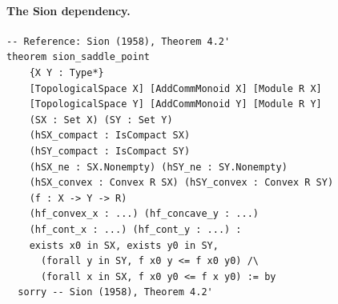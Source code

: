 \documentclass[11pt,a4paper]{article}
\theoremstyle{definition}
\begin{document}
\paragraph{The Sion dependency.}
\begin{lstlisting}[caption={Sion's minimax theorem in the dependency file (excerpt from \texttt{Dependencies.lean}).},label={lst:sion}]
-- Reference: Sion (1958), Theorem 4.2'
theorem sion_saddle_point
    {X Y : Type*}
    [TopologicalSpace X] [AddCommMonoid X] [Module R X]
    [TopologicalSpace Y] [AddCommMonoid Y] [Module R Y]
    (SX : Set X) (SY : Set Y)
    (hSX_compact : IsCompact SX)
    (hSY_compact : IsCompact SY)
    (hSX_ne : SX.Nonempty) (hSY_ne : SY.Nonempty)
    (hSX_convex : Convex R SX) (hSY_convex : Convex R SY)
    (f : X -> Y -> R)
    (hf_convex_x : ...) (hf_concave_y : ...)
    (hf_cont_x : ...) (hf_cont_y : ...) :
    exists x0 in SX, exists y0 in SY,
      (forall y in SY, f x0 y <= f x0 y0) /\
      (forall x in SX, f x0 y0 <= f x y0) := by
  sorry -- Sion (1958), Theorem 4.2'
\end{lstlisting}
\end{document}
